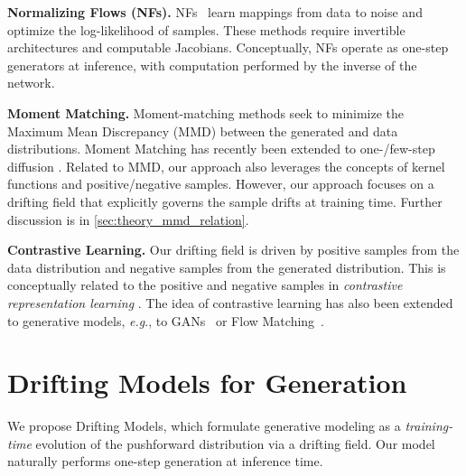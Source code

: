 \documentclass{article}
\renewcommand{\paragraph}[1]{\vspace{.05em}\noindent\textbf{#1}}
\def\onedot{.}
\def\eg{\emph{e.g}\onedot} \def\Eg{\emph{E.g}\onedot}
\theoremstyle{plain}
\theoremstyle{definition}
\theoremstyle{remark}
\begin{document}
\paragraph{Normalizing Flows (NFs).}
NFs~\cite{rezende2015variational,dinh2016density,zhai2024normalizing} learn mappings from data to noise and optimize the log-likelihood of samples.
These methods require invertible architectures and computable Jacobians. Conceptually, NFs operate as one-step generators at inference, with computation performed by the \mbox{inverse} of the network.

\paragraph{Moment Matching.}
Moment-matching methods \cite{dziugaite2015training,li2015generative} seek to minimize the Maximum Mean Discrepancy (MMD) between the generated and data distributions.
Moment Matching has recently been extended to one-/few-step diffusion \cite{zhou2025inductive}.
Related to MMD, our approach also leverages the concepts of kernel functions and positive/negative samples. However, our approach focuses on a drifting field that explicitly governs the sample drifts at training time. Further discussion is in \ref{sec:theory_mmd_relation}.

\paragraph{Contrastive Learning.}
Our drifting field is driven by positive samples from the data distribution and negative samples from the generated distribution.
This is conceptually related to the positive and negative samples in \textit{contrastive representation learning} \cite{hadsell2006dimensionality,oord2018representation}.
The idea of contrastive learning has also been extended to generative models, \eg, to GANs~\cite{unterthiner2017coulomb,kang2020contragan} or Flow Matching~\cite{stoica2025contrastive}.


\section{Drifting Models for Generation}
\label{sec:methodology}

We propose Drifting Models, which formulate generative modeling as a \emph{training-time} evolution of the pushforward distribution via a drifting field.
Our model naturally performs one-step generation at inference time.
\end{document}
